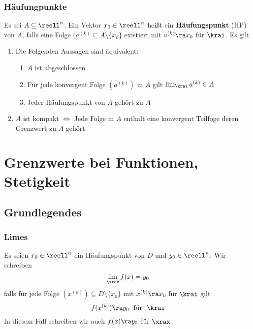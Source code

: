 \documentclass{kit}
\begin{document}
    \subsubsection{Häufungpunkte}
      Es sei $A\subseteq\reell^n$. Ein Vektor $x_0\in\reell^n$ heißt ein \textbf{Häufungspunkt} (HP) von $A$, falls eine
      Folge $(a^{(k)}\subseteq A\setminus\{x_o\}$ existiert mit $a^{(k)}\ra x_0$ für $\krai$. Es gilt
      \begin{enumerate}
        \item Die Folgenden Aussagen sind äquivalent:
          \begin{enumerate}[label=\roman*)]
            \item $A$ ist abgeschlossen
            \item Für jede konvergent Folge $(a^{(k)})$ in $A$ gilt $\lim_\krai a^{(k)}\in A$
            \item Jeder Häufungspunkt von $A$ gehört zu $A$
          \end{enumerate}
        \item $A$ ist kompakt $\Longleftrightarrow$ Jede Folge in $A$ enthält eine konvergent Teilfoge deren Grenzwert zu 
          $A$ gehört.
      \end{enumerate}
\section{Grenzwerte bei Funktionen, Stetigkeit}
  \subsection{Grundlegendes}
    \subsubsection{Limes}
      Es seien $x_0\in\reell^n$ ein Häufungspunkt von $D$ und $y_0\in\reell^n$. Wir schreiben
      $$\lim_{\xrax}f(x)=y_0$$
      falls für jede Folge $(x^{(k)})\subseteq D\setminus\{x_0\}$ mit $x^{(k)}\ra x_0$ für $\krai$ gilt
      $$f(x^{(k)})\ra y_0\ \text{ für }\ \krai$$
      In diesem Fall schreiben wir auch $f(x)\ra y_0$ für $\xrax$
\end{document}
